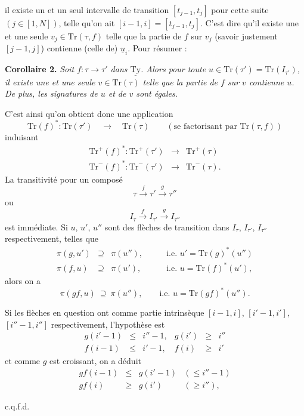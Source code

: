 \documentclass[11pt]{article}
\newcommand{\printedpage}[1]{\if\relax\detokenize{#1}\relax\else\marginpar{\raggedright\footnotesize p.~#1}\fi}
\newcommand{\msp}[1]{\marginpar{\raggedright\footnotesize [#1]}}
\newcommand{\uTy}{\underline{\mathrm{Ty}}}
\newcommand{\Tr}{\mathrm{Tr}}
\begin{document}
\printedpage{27}
\msp{page 42}
il existe un et un seul intervalle de transition $[t_{j-1}, t_j]$ pour cette suite $(j \in [1, N])$, telle qu'on ait $[i-1, i] = [t_{j-1}, t_j]$. C'est dire qu'il existe une et une seule $v_j \in \Tr(\tau, f)$ telle que la partie de $f$ sur $v_j$ (savoir justement $[j-1, j]$) contienne (celle de) $\underline{u}_i$. Pour résumer :

\textbf{Corollaire 2.} \textit{Soit $f : \tau \longrightarrow \tau'$ dans $\uTy$. Alors pour toute $u \in \Tr(\tau') = \Tr(I_{\tau'})$, il existe une et une seule $v \in \Tr(\tau)$ telle que la partie de $f$ sur $v$ contienne $u$. De plus, les signatures de $u$ et de $v$ sont égales.}

C'est ainsi qu'on obtient donc une application
\[
\Tr(f)^* : \Tr(\tau') \quad \longrightarrow \quad \Tr(\tau) \qquad (\text{se factorisant par } \Tr(\tau, f))
\]
induisant
\[
\begin{array}{rcl}
\Tr^+(f)^* : \Tr^+(\tau') & \longrightarrow & \Tr^+(\tau) \\
\Tr^-(f)^* : \Tr^-(\tau') & \longrightarrow & \Tr^-(\tau).
\end{array}
\]
La transitivité pour un composé
\[
\tau \xrightarrow{f} \tau' \xrightarrow{g} \tau''
\]
ou
\[
I_\tau \xrightarrow{f} I_{\tau'} \xrightarrow{g} I_{\tau''}
\]
est immédiate. Si $u$, $u'$, $u''$ sont des flèches de transition dans $I_\tau$, $I_{\tau'}$, $I_{\tau''}$ respectivement, telles que
\[
\begin{array}{rcll}
\pi(g, u') & \supseteq & \pi(u''), & \qquad \text{i.e. } u' = \Tr(g)^*(u'') \\
\pi(f, u) & \supseteq & \pi(u'), & \qquad \text{i.e. } u = \Tr(f)^*(u'),
\end{array}
\]
alors on a
\[
\pi(gf, u) \ \supseteq\ \pi(u''), \qquad \text{i.e. } u = \Tr(gf)^*(u'').
\]

\msp{page 43}
Si les flèches en question ont comme partie intrinsèque $[i-1, i]$, $[i'-1, i']$, $[i''-1, i'']$ respectivement, l'hypothèse est
\[
\begin{array}{rclrcl}
g(i'-1) & \leq & i''-1, & g(i') & \geq & i'' \\
f(i-1) & \leq & i'-1, & f(i) & \geq & i'
\end{array}
\]
et comme $g$ est croissant, on a déduit
\[
\begin{array}{rcll}
gf(i-1) & \leq & g(i'-1) & (\leq i''-1) \\
gf(i) & \geq & g(i') & (\geq i''),
\end{array}
\]
\begin{flushright}
c.q.f.d.
\end{flushright}
\end{document}

